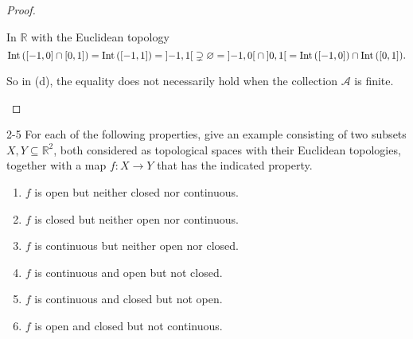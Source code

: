 \begin{proof}
\begin{enumerate}[label={(\alph*)}]
		      In $\mathbb{R}$ with the Euclidean topology
		      \[
			      \operatorname{Int}\left({\left[{-1,0}\right] \cap \left[{0,1}\right]}\right) = \operatorname{Int}{\left(\left[{-1,1}\right]\right)} = \left]{-1,1}\right[ \supsetneq \varnothing = \left]{-1,0}\right[ \cap \left]{0,1}\right[ = \operatorname{Int}{\left(\left[{-1,0}\right]\right)}\cap\operatorname{Int}{\left(\left[{0,1}\right]\right)}.
		      \]

		      So in (d), the equality does not necessarily hold when the collection $\mathscr{A}$ is finite.
	\end{enumerate}
\end{proof}

\begin{problem}{2-5}
For each of the following properties, give an example consisting of two subsets $X, Y \subseteq \mathbb{R}^{2}$, both considered as topological spaces with their Euclidean topologies, together with a map $f: X \to Y$ that has the indicated property.
\begin{enumerate}[label={(\alph*)}]
	\item $f$ is open but neither closed nor continuous.
	\item $f$ is closed but neither open nor continuous.
	\item $f$ is continuous but neither open nor closed.
	\item $f$ is continuous and open but not closed.
	\item $f$ is continuous and closed but not open.
	\item $f$ is open and closed but not continuous.
\end{enumerate}
\end{problem}

